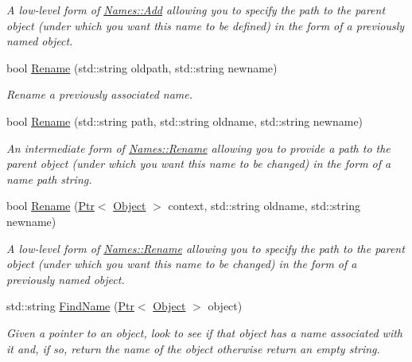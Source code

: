\begin{DoxyCompactItemize}
\begin{DoxyCompactList}\small\item\em A low-\/level form of \hyperlink{classns3_1_1Names_a5075ee36f97059d897cf6430ce61e592}{Names\+::\+Add} allowing you to specify the path to the parent object (under which you want this name to be defined) in the form of a previously named object. \end{DoxyCompactList}\item 
bool \hyperlink{classns3_1_1NamesPriv_a51f6ec455739940fa02c6b46d1ea273a}{Rename} (std\+::string oldpath, std\+::string newname)
\begin{DoxyCompactList}\small\item\em Rename a previously associated name. \end{DoxyCompactList}\item 
bool \hyperlink{classns3_1_1NamesPriv_a6f0e7c4335aac3b5ed4abe0b7cc43ebc}{Rename} (std\+::string path, std\+::string oldname, std\+::string newname)
\begin{DoxyCompactList}\small\item\em An intermediate form of \hyperlink{classns3_1_1Names_a0ed4aa6358357bef3930cd19ba306373}{Names\+::\+Rename} allowing you to provide a path to the parent object (under which you want this name to be changed) in the form of a name path string. \end{DoxyCompactList}\item 
bool \hyperlink{classns3_1_1NamesPriv_aa8e3600d5c9144e472ddf263040e2f6b}{Rename} (\hyperlink{classns3_1_1Ptr}{Ptr}$<$ \hyperlink{classns3_1_1Object}{Object} $>$ context, std\+::string oldname, std\+::string newname)
\begin{DoxyCompactList}\small\item\em A low-\/level form of \hyperlink{classns3_1_1Names_a0ed4aa6358357bef3930cd19ba306373}{Names\+::\+Rename} allowing you to specify the path to the parent object (under which you want this name to be changed) in the form of a previously named object. \end{DoxyCompactList}\item 
std\+::string \hyperlink{classns3_1_1NamesPriv_a7fbc3ac7b8924c08d86ddc79d96385fa}{Find\+Name} (\hyperlink{classns3_1_1Ptr}{Ptr}$<$ \hyperlink{classns3_1_1Object}{Object} $>$ object)
\begin{DoxyCompactList}\small\item\em Given a pointer to an object, look to see if that object has a name associated with it and, if so, return the name of the object otherwise return an empty string. \end{DoxyCompactList}\item 

\end{DoxyCompactItemize}
